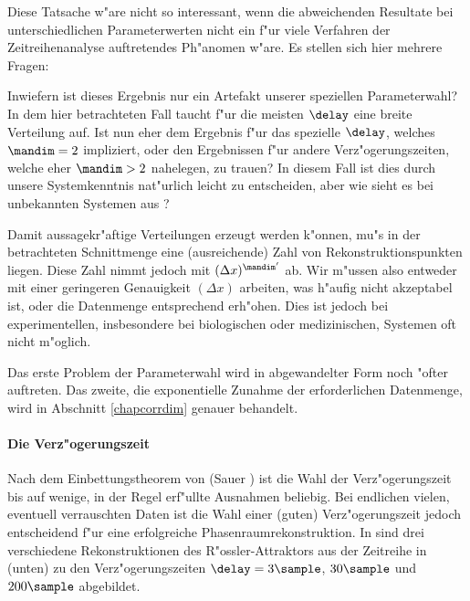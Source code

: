 Diese Tatsache w"are nicht so interessant, wenn die abweichenden Resultate bei
unterschiedlichen Parameterwerten nicht ein f"ur viele Verfahren der Zeitreihenanalyse
auftretendes Ph"anomen w"are. Es stellen sich hier mehrere Fragen:
\begin{myitemize}
\item Inwiefern ist dieses Ergebnis nur ein Artefakt unserer speziellen Parameterwahl? In
  dem hier betrachteten Fall taucht f"ur die meisten $\delay$ eine breite Verteilung auf.
  Ist nun eher dem Ergebnis f"ur das spezielle $\delay$, welches $\mandim=2$ impliziert,
  oder den Ergebnissen f"ur andere Verz"ogerungszeiten, welche eher $\mandim>2$ nahelegen,
  zu trauen? In diesem Fall ist dies durch unsere Systemkenntnis nat"urlich leicht zu
  entscheiden, aber wie sieht es bei unbekannten Systemen aus ?
\item Damit aussagekr"aftige Verteilungen erzeugt werden k"onnen, mu"s in der
  betrachteten Schnittmenge eine \naja(ausreichende) Zahl von Rekonstruktionspunkten
  liegen. Diese Zahl nimmt jedoch mit $(\Delta x)^{\mandim'}$ ab. Wir m"ussen also
  entweder mit einer geringeren Genauigkeit $(\Delta x)$ arbeiten, was h"aufig nicht
  akzeptabel ist, oder die Datenmenge entsprechend erh"ohen. Dies ist jedoch bei
  experimentellen, insbesondere bei biologischen oder medizinischen, Systemen oft
  nicht m"oglich.
\end{myitemize}

Das erste Problem der Parameterwahl wird in abgewandelter Form noch "ofter auftreten. Das
zweite, die exponentielle Zunahme der erforderlichen Datenmenge, wird in Abschnitt
\ref{chapcorrdim} genauer behandelt.

\paragraph{Die Verz"ogerungszeit}
\label{chapdelay}

Nach dem Einbettungstheorem von \autor(Sauer \etal) ist die Wahl der Verz"ogerungszeit bis auf wenige, in der Regel
erf"ullte Ausnahmen beliebig. Bei endlichen vielen, eventuell verrauschten Daten ist die Wahl
einer \naja(guten) Verz"ogerungszeit jedoch entscheidend f"ur eine erfolgreiche
Phasenraumrekonstruktion. In  sind drei verschiedene Rekonstruktionen des
R"ossler-Attraktors aus der Zeitreihe in  (unten) zu den Verz"ogerungszeiten
$\delay=3\sample$, $30\sample$ und $200\sample$ abgebildet.


